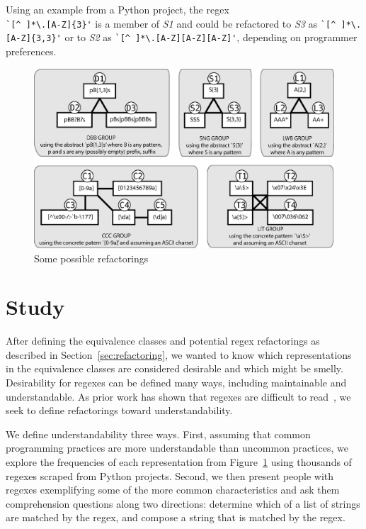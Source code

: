 Using an example from a Python project, the regex\\ \verb!`[^ ]*\.[A-Z]{3}'! is a member of \emph{S1} and could be refactored to \emph{S3} as \verb!`[^ ]*\.[A-Z]{3,3}'!  or to \emph{S2} as \verb!`[^ ]*\.[A-Z][A-Z][A-Z]'!, depending on programmer preferences.





\begin{figure}[tb]
\centering
\includegraphics[width=\textwidth]{illustrations/refactoringTree.eps}
\vspace{-12pt}
\caption{Some possible refactorings}
\vspace{-6pt}
\label{fig:refactoringTree}
\end{figure}















\section{Study}
\label{sec:study}
After defining the equivalence classes and potential  regex refactorings as described in Section~\ref{sec:refactoring}, we wanted to know which representations in the equivalence classes  are considered desirable and which might be smelly. Desirability for regexes can be defined many ways, including maintainable and understandable. As prior work has shown that regexes are difficult to read~\cite{}, we seek to define refactorings toward understandability. 

We define understandability three ways. First, assuming that common programming practices are more understandable than uncommon practices, we explore the frequencies of each representation from Figure~\ref{fig:refactoringTree} using thousands of regexes scraped from Python projects. Second, we then present people with regexes exemplifying some of the more common characteristics and ask them comprehension questions along two directions: determine which of a list of strings are matched by the regex, and compose a string that is matched by the regex. 

